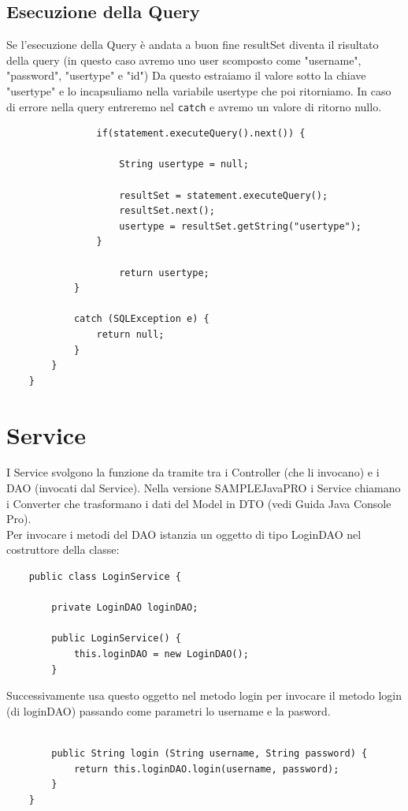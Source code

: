 \documentclass[a4paper,12 pt]{article}
\begin{document}
	\subsection{Esecuzione della Query}
	Se l'esecuzione della Query è andata a buon fine resultSet diventa il risultato della query (in questo caso avremo uno user scomposto come "username", "password", "usertype" e "id")
	Da questo estraiamo il valore sotto la chiave "usertype" e lo incapsuliamo nella variabile usertype che poi ritorniamo. In caso di errore nella query entreremo nel \texttt{catch} e avremo un valore di ritorno nullo.
	\begin{lstlisting}
				if(statement.executeQuery().next()) {
				
					String usertype = null;
					
					resultSet = statement.executeQuery();
					resultSet.next();
					usertype = resultSet.getString("usertype");
				}
		
					return usertype;
			}
		
			catch (SQLException e) {
				return null;
			}
		}
	}
	\end{lstlisting}
\clearpage

	\section{Service}
	I Service svolgono la funzione da tramite tra i Controller (che li invocano) e i DAO (invocati dal Service). Nella versione SAMPLEJavaPRO i Service chiamano i Converter che trasformano i dati del Model in DTO (vedi Guida Java Console Pro).\\
	
	Per invocare i metodi del DAO istanzia un oggetto di tipo LoginDAO nel costruttore della classe:
	\begin{lstlisting}
	public class LoginService {
	
		private LoginDAO loginDAO;

		public LoginService() {
			this.loginDAO = new LoginDAO();
		}
	\end{lstlisting}
	
	Successivamente usa questo oggetto nel metodo login per invocare il metodo login (di loginDAO) passando come parametri lo username e la pasword.
	\begin{lstlisting}

		public String login (String username, String password) {
			return this.loginDAO.login(username, password);
		}
	}
	
	\end{lstlisting}
	
\end{document}
